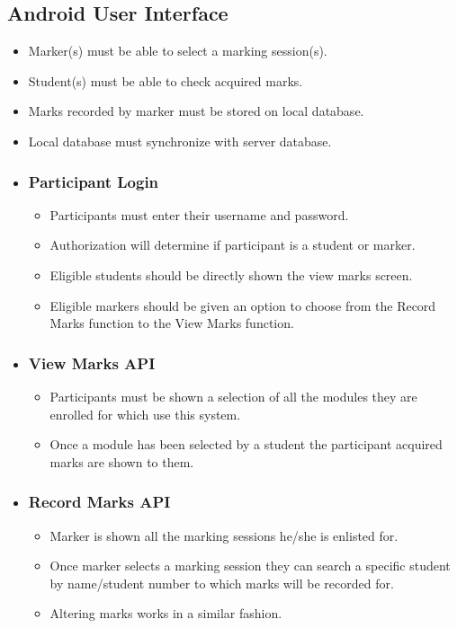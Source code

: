 \documentclass[10pt,a4paper]{article}
\begin{document}
	\subsection*{Android User Interface}
	\begin{itemize}
		\item Marker(s) must be able to select a marking session(s).
		\item Student(s) must be able to check acquired marks.
		\item Marks recorded by marker must be stored on local database.
		\item Local database must synchronize with server database.
	
		\item \subsubsection*{Participant Login}
		\begin{itemize}
			\item Participants must enter their username and password.
			\item Authorization will determine if participant is a student or marker. 
			\item Eligible students should be directly shown the view marks screen.
			\item Eligible markers should be given an option to choose from the Record Marks function to the View Marks function.
		\end{itemize}
		
		
		\item \subsubsection*{View Marks API}
		\begin{itemize}
			\item Participants must be shown a selection of all the modules they are enrolled for which use this system. 
			\item Once a module has been selected by a student the participant acquired marks are shown to them.
		\end{itemize}
		
		
		\item \subsubsection*{Record Marks API}
		\begin{itemize}
			\item Marker is shown all the marking sessions he/she is enlisted for.
			\item Once marker selects a marking session they can search a specific student by name/student number to which marks will be recorded for.
			\item Altering marks works in a similar fashion.
		\end{itemize}
	\end{itemize}
\end{document}
